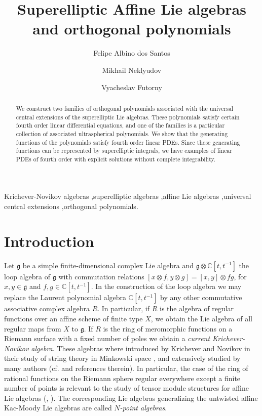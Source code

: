 \documentclass[review,nopreprintline]{elsarticle}
\theoremstyle{definition}
\numberwithin{equation}{section}
\theoremstyle{remark}
\newcommand{\fg}{\mathfrak{g}}
\newcommand{\ot}{\otimes}
\newcommand{\Cx}{\mathbb{C}}
\begin{document}
	\begin{frontmatter}
	
	    \title{Superelliptic Affine Lie algebras and orthogonal polynomials}
	    
		    \author{Felipe Albino dos Santos}
		    \author{Mikhail Neklyudov}
		    \author{Vyacheslav Futorny }
	  
	    \begin{abstract}
	    	We construct two families of orthogonal polynomials associated with the universal central extensions of the superelliptic Lie algebras. These polynomials satisfy certain fourth order linear differential equations,  and one of the families is a particular collection of associated ultraspherical polynomials. We show that the generating functions of the polynomials satisfy fourth order linear PDEs. Since these generating functions  can be represented by superelliptic integrals, we have examples of linear PDEs of fourth order with explicit solutions without  complete integrability.
	    \end{abstract}
	
	    \begin{keyword}
	    	Krichever-Novikov algebras \sep superelliptic algebras \sep affine Lie algebras \sep universal central extensions \sep orthogonal polynomials.
	    \end{keyword}
	
	\end{frontmatter}

	\section*{Introduction}
	    Let $\fg$ be a simple finite-dimensional complex Lie algebra and $\fg\ot\Cx[t,t^{-1}]$ the loop algebra of $\fg$ with commutation relations $[x\ot f, y\ot g]=[x,y]\ot fg$, for $x,y\in\fg$ and $f,g\in\Cx[t,t^{-1}]$.  In the construction of the loop algebra we may replace the Laurent polynomial algebra $\Cx[t,t^{-1}]$ by any other commutative associative complex algebra $R$. 
	    In particular, if $R$ is the algebra of regular functions over an affine scheme of finite type $X$, we obtain the Lie algebra of all regular maps from $X$ to $\fg$. If $R$ is the ring of meromorphic functions on a Riemann surface with a fixed number of poles we obtain a \emph{current Krichever-Novikov algebra}. These algebras  where introduced by Krichever and Novikov in their study of string theory in Minkowski space \cite{krichever1987algebras}, \cite{Krichever1988} and extensively studied by many authors (cf. \cite{schlichenmaier2014} and  references therein). In particular, the case of the ring of rational functions on the Riemann sphere regular everywhere except a finite number of points is relevant to the study of  tensor module structures for affine Lie algebras (\cite{Kazhdan1991}, \cite{Kazhdan1994}). The corresponding Lie algebras generalizing the untwisted affine Kac-Moody Lie algebras are called {\it{$N$-point algebras}}. 
	    
\end{document}
